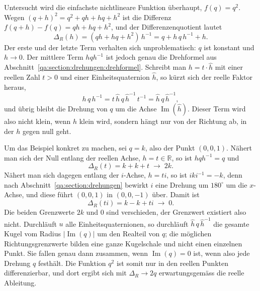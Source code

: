\begin{beispiel}
    Untersucht wird die einfachste nichtlineare Funktion überhaupt,
    $f(q) = q^2$. Wegen $(q+h)^2 = q^2 + qh + hq + h^2$ ist die Differenz
    $f(q+h) - f(q) = qh + hq + h^2$, und der Differenzenquotient lautet
    \begin{equation*}
        \Delta_R(h) = (qh + hq + h^2)\,h^{-1}
        = q + h\,q\,h^{-1} + h .
    \end{equation*}
    Der erste und der letzte Term verhalten sich unproblematisch: $q$ ist
    konstant und $h \to 0$. Der mittlere Term $h q h^{-1}$ ist jedoch genau die
    Drehformel aus Abschnitt~\ref{qa:section:drehungen:drehformel}. Schreibt man
    $h = t \cdot \hat{h}$ mit einer reellen Zahl $t > 0$ und einer 
    Einheitsquaternion
    $\hat{h}$, so kürzt sich der reelle Faktor heraus,
    \begin{equation*}
        h\,q\,h^{-1} 
        = t\,\hat{h}\,q\,\hat{h}^{-1}\,t^{-1} 
        = \hat{h}\,q\,\hat{h}^{-1},
    \end{equation*}
    und übrig bleibt die Drehung von $q$ um die Achse $\operatorname{Im}(\hat{h})$.
    Dieser Term wird also nicht klein, wenn $h$ klein wird, sondern hängt nur von 
    der Richtung ab, in der $h$ gegen null geht.
\end{beispiel}



Um das Beispiel konkret zu machen, sei $q = k$, also der Punkt $(0,0,1)$. Nähert 
man sich der Null entlang
der reellen Achse, $h = t \in \mathbb{R}$, so ist $hqh^{-1} = q$ und
\begin{equation*}
    \Delta_R(t) 
    = k + k + t \;\longrightarrow\; 2k .
\end{equation*}
Nähert man sich dagegen entlang der $i$-Achse, $h = ti$, so ist
$i k i^{-1} = -k$, denn nach Abschnitt~\ref{qa:section:drehungen} bewirkt $i$
eine Drehung um $180^\circ$ um die $x$-Achse, und diese führt $(0,0,1)$ in
$(0,0,-1)$ über. Damit ist
\begin{equation*}
    \Delta_R(ti) 
    = k - k + ti \;\longrightarrow\; 0 .
\end{equation*}
Die beiden Grenzwerte $2k$ und $0$ sind verschieden, der Grenzwert existiert
also nicht. Durchläuft $u$ alle Einheitsquaternionen, so durchläuft
$\hat{h}\,q\,\hat{h}^{-1}$ die gesamte Kugel vom Radius $|\operatorname{Im}(q)|$ 
um den Realteil von $q$; die möglichen Richtungsgrenzwerte bilden eine ganze
Kugelschale und nicht einen einzelnen Punkt. Sie fallen genau dann zusammen,
wenn $\operatorname{Im}(q) = 0$ ist, wenn also jede Drehung $q$ festhält. Die
Funktion $q^2$ ist somit nur in den reellen Punkten differenzierbar, und dort
ergibt sich mit $\Delta_R \to 2q$ erwartungsgemäss die reelle Ableitung.

